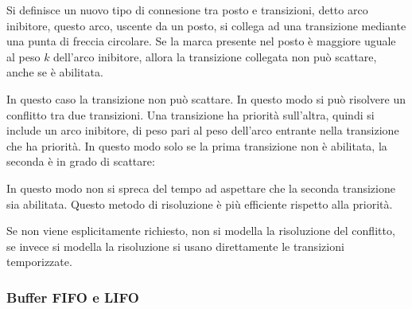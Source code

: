 \documentclass{article}
\numberwithin{equation}{subsection}
\begin{document}
Si definisce un nuovo tipo di connesione tra posto e transizioni, detto arco inibitore, questo arco, uscente da un posto, si collega ad una transizione mediante una punta di 
freccia circolare. Se la marca presente nel posto è maggiore uguale al peso $k$ dell'arco inibitore, allora la transizione collegata non può scattare, anche se è abilitata. 
\begin{center}
\end{center}
In questo caso la transizione non può scattare. In questo modo si può risolvere un conflitto tra due transizioni. Una transizione ha priorità sull'altra, quindi si include 
un arco inibitore, di peso pari al peso dell'arco entrante nella transizione che ha priorità. In questo modo solo se la prima transizione non è abilitata, la seconda è in 
grado di scattare:
\begin{center}
\end{center}
In questo modo non si spreca del tempo ad aspettare che la seconda transizione sia abilitata. Questo metodo di risoluzione è più efficiente rispetto alla priorità. 

Se non viene esplicitamente richiesto, non si modella la risoluzione del conflitto, se invece si modella la risoluzione si usano direttamente le transizioni temporizzate. 

\subsubsection{Buffer FIFO e LIFO}
\end{document}
